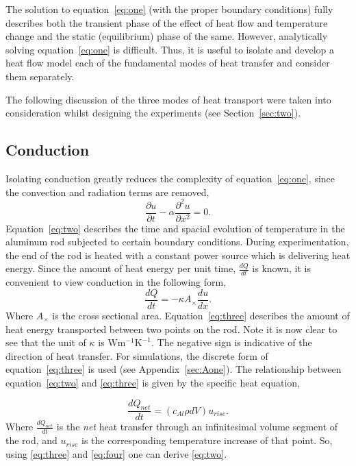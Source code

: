\documentclass[10pt,aps,prb,twocolumn, nofootinbib]{revtex4-1}
\newcommand{\ut}{\ensuremath{\frac{\partial u}{\partial t}}}
\newcommand{\uxx}{\ensuremath{\frac{\partial^2 u}{\partial x^2}}}
\newcommand{\Qt}{\ensuremath{\frac{dQ}{dt}} }
\begin{document}
The solution to equation~\ref{eq:one} (with the proper boundary conditions) fully describes both the transient phase of the effect of heat flow and temperature change and the static (equilibrium) phase of the same. However, analytically solving equation~\ref{eq:one} is difficult. Thus, it is useful to isolate and develop a heat flow model each of the fundamental modes of heat transfer and consider them separately. 

The following discussion of the three modes of heat transport were taken into consideration whilst designing the experiments (see Section~\ref{sec:two}).

\subsection{\label{sec:oneCond}Conduction}
Isolating conduction greatly reduces the complexity of equation~\ref{eq:one}, since the convection and radiation terms are removed, \begin{equation}
\label{eq:two}
\ut - \alpha\uxx = 0.
\end{equation}
Equation~\ref{eq:two} describes the time and spacial evolution of temperature in the aluminum rod subjected to certain boundary conditions. During experimentation, the end of the rod is heated with a constant power source which is delivering heat energy. Since the amount of heat energy per unit time, \Qt is known, it is convenient to view conduction in the following form,
\begin{equation}
\label{eq:three}
\Qt = -\kappa A_{\times}\frac{du}{dx}.
\end{equation}
Where $A_{\times}$ is the cross sectional area. Equation~\ref{eq:three} describes the amount of heat energy transported between two points on the rod. Note it is now clear to see that the unit of $\kappa$ is $\text{W}\text{m}^{-1}\text{K}^{-1}$. The negative sign is indicative of the direction of heat transfer. For simulations, the discrete form of equation~\ref{eq:three} is used (see Appendix~\ref{sec:Aone}). The relationship between equation~\ref{eq:two} and \ref{eq:three} is given by the specific heat equation,

\begin{equation}
\label{eq:four}
\frac{dQ_{net}}{dt} = (c_{Al}\rho dV) u_{rise}.
\end{equation}
Where $\frac{dQ_{net}}{dt}$ is the \emph{net} heat transfer through an infinitesimal volume segment of the rod, and $u_{rise}$ is the corresponding temperature increase of that point. So, using \ref{eq:three} and \ref{eq:four} one can derive \ref{eq:two}.
\end{document}
